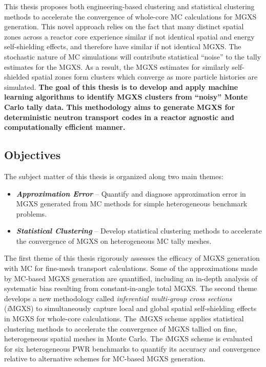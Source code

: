 \documentclass[12pt,twoside]{mitthesis-exec}
\begin{document}
This thesis proposes both engineering-based clustering and statistical clustering methods to accelerate the convergence of whole-core MC calculations for MGXS generation. This novel approach relies on the fact that many distinct spatial zones across a reactor core experience similar if not identical spatial and energy self-shielding effects, and therefore have similar if not identical MGXS. The stochastic nature of MC simulations will contribute statistical ``noise'' to the tally estimates for the MGXS. As a result, the MGXS estimates for similarly self-shielded spatial zones form clusters which converge as more particle histories are simulated. \textbf{The goal of this thesis is to develop and apply machine learning algorithms to identify MGXS clusters from ``noisy'' Monte Carlo tally data. This methodology aims to generate MGXS for deterministic neutron transport codes in a reactor agnostic and computationally efficient manner.}

\subsection*{Objectives}

The subject matter of this thesis is organized along two main themes:

\begin{itemize}
\item \textbf{\textit{Approximation Error}} -- Quantify and diagnose approximation error in MGXS generated from MC methods for simple heterogeneous benchmark problems.
\item \textbf{\textit{Statistical Clustering}} -- Develop statistical clustering methods to accelerate the convergence of MGXS on heterogeneous MC tally meshes.
\end{itemize}

The first theme of this thesis rigorously assesses the efficacy of MGXS generation with MC for fine-mesh transport calculations. Some of the approximations made by MC-based MGXS generation are quantified, including an in-depth analysis of systematic bias resulting from constant-in-angle total MGXS. The second theme develops a new methodology called \textit{inferential multi-group cross sections} (\textit{i}MGXS) to simultaneously capture local and global spatial self-shielding effects in MGXS for whole-core calculations. The \textit{i}MGXS scheme applies statistical clustering methods to accelerate the convergence of MGXS tallied on fine, heterogeneous spatial meshes in Monte Carlo. The \textit{i}MGXS scheme is evaluated for six heterogeneous PWR benchmarks to quantify its accuracy and convergence relative to alternative schemes for MC-based MGXS generation.
\end{document}
